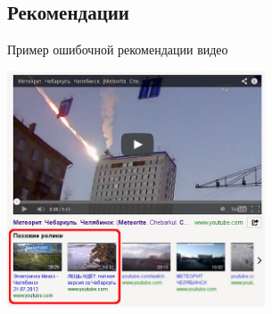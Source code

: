 \subsection{Рекомендации}

\begin{frame}{Пример ошибочной рекомендации видео}
    \begin{center}
        \includegraphics[height=7cm]{img/video/video-recomendation.png}
    \end{center}
\end{frame}


